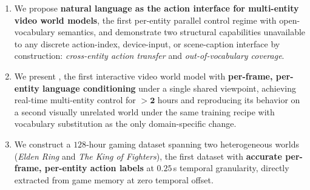 \begin{enumerate}[leftmargin=*,topsep=1pt,itemsep=0pt]
\item We propose \textbf{natural language as the action interface for multi-entity video world models}, the first per-entity parallel control regime with open-vocabulary semantics, and demonstrate two structural capabilities unavailable to any discrete action-index, device-input, or scene-caption interface by construction: \textit{cross-entity action transfer} and \textit{out-of-vocabulary coverage}.
\item We present \methodname, the first interactive video world model with \textbf{per-frame, per-entity language conditioning} under a single shared viewpoint, achieving real-time multi-entity control for $\mathbf{>2}$ hours and reproducing its behavior on a second visually unrelated world under the same training recipe with vocabulary substitution as the only domain-specific change.
\item We construct a $128$-hour gaming dataset spanning two heterogeneous worlds (\textit{Elden Ring} and \textit{The King of Fighters}), the first dataset with \textbf{accurate per-frame, per-entity action labels} at $0.25$\,s temporal granularity, directly extracted from game memory at zero temporal offset.
\end{enumerate}


